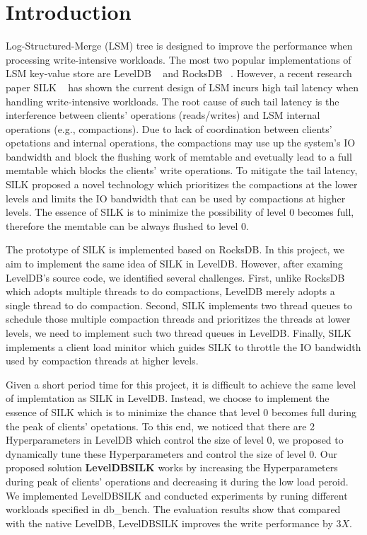 \documentclass[letter,twocolumn,10pt]{article}
\begin{document}
\section{Introduction}
Log-Structured-Merge (LSM) tree is designed to improve the performance when processing write-intensive workloads. The most two popular implementations of LSM key-value store are LevelDB ~\cite{leveldb} and RocksDB ~\cite{rocksdb}. However, a recent research paper SILK ~\cite{usenixsilk} has shown the current design of LSM incurs high tail latency when handling write-intensive workloads. The root cause of such tail latency is the interference between clients' operations (reads/writes) and LSM internal operations (e.g., compactions). Due to lack of coordination between clients' opetations and internal operations, the compactions may use up the system's IO bandwidth and block the flushing work of memtable and evetually lead to a full memtable which blocks the clients' write operations. To mitigate the tail latency, SILK proposed a novel technology which prioritizes the compactions at the lower levels and limits the IO bandwidth that can be used by compactions at higher levels. The essence of SILK is to minimize the possibility of level 0 becomes full, therefore the memtable can be always flushed to level 0.

The prototype of SILK is implemented based on RocksDB. In this project, we aim to implement the same idea of SILK in LevelDB. However, after examing LevelDB's source code, we identified several challenges. First, unlike RocksDB which adopts multiple threads to do compactions, LevelDB merely adopts a single thread to do compaction. Second, SILK implements two thread queues to schedule those multiple compaction threads and prioritizes the threads at lower levels, we need to implement such two thread queues in LevelDB. Finally, SILK implements a client load minitor which guides SILK to throttle the IO bandwidth used by compaction threads at higher levels.

Given a short period time for this project, it is difficult to achieve the same level of implemtation as SILK in LevelDB. Instead, we choose to implement the essence of SILK which is to minimize the chance that level 0 becomes full during the peak of clients' opetations. To this end, we noticed that there are 2 Hyperparameters in LevelDB which control the size of level 0, we proposed to dynamically tune these Hyperparameters and control the size of level 0. Our proposed solution \textbf{LevelDBSILK} works by increasing the Hyperparameters during peak of clients' operations and decreasing it during the low load peroid. We implemented LevelDBSILK and conducted experiments by runing different workloads specified in \textsf{db\_bench}. The evaluation results show that compared with the native LevelDB, LevelDBSILK improves the write performance by $3X$.
\end{document}

